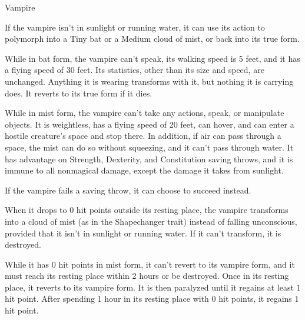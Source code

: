 \begin{DndMonster}[float*=hb, width=\textwidth + 8pt]{Vampire}
\begin{multicols}{2}
\DndMonsterBasics[armor-class={16 (natural armor)}, hit-points={170 (20d8 + 80)}, speed={30 ft.}]
\DndMonsterDetails[saving-throws={}, skills={Perception +7, Stealth +9}, damage-immunities={}, damage-resistances={necrotic}, damage-vulnerabilities={}, condition-immunities={}, senses={darkvision 120 ft., passive Perception 17}, languages={the languages it knew in life}, challenge={10:11}]
 If the vampire isn't in sunlight or running water, it can use its action to polymorph into a Tiny bat or a Medium cloud of mist, or back into its true form.

While in bat form, the vampire can't speak, its walking speed is 5 feet, and it has a flying speed of 30 feet. Its statistics, other than its size and speed, are unchanged. Anything it is wearing transforms with it, but nothing it is carrying does. It reverts to its true form if it dies.

While in mist form, the vampire can't take any actions, speak, or manipulate objects. It is weightless, has a flying speed of 20 feet, can hover, and can enter a hostile creature's space and stop there. In addition, if air can pass through a space, the mist can do so without squeezing, and it can't pass through water. It has advantage on Strength, Dexterity, and Constitution saving throws, and it is immune to all nonmagical damage, except the damage it takes from sunlight.

 If the vampire fails a saving throw, it can choose to succeed instead.

 When it drops to 0 hit points outside its resting place, the vampire transforms into a cloud of mist (as in the Shapechanger trait) instead of falling unconscious, provided that it isn't in sunlight or running water. If it can't transform, it is destroyed.

While it has 0 hit points in mist form, it can't revert to its vampire form, and it must reach its resting place within 2 hours or be destroyed. Once in its resting place, it reverts to its vampire form. It is then paralyzed until it regains at least 1 hit point. After spending 1 hour in its resting place with 0 hit points, it regains 1 hit point.


\end{multicols}
\end{DndMonster}
